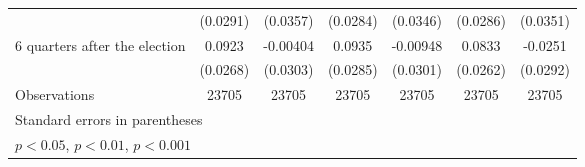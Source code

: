 \begin{table}[htbp]
\begin{tabular}{l*{6}{c}}
                    &    (0.0291)         &    (0.0357)         &    (0.0284)         &    (0.0346)         &    (0.0286)         &    (0.0351)         \\
[1em]
 6 quarters after the election&      0.0923\sym{***}&    -0.00404         &      0.0935\sym{**} &    -0.00948         &      0.0833\sym{**} &     -0.0251         \\
                    &    (0.0268)         &    (0.0303)         &    (0.0285)         &    (0.0301)         &    (0.0262)         &    (0.0292)         \\
\hline
Observations        &       23705         &       23705         &       23705         &       23705         &       23705         &       23705         \\
\hline\hline
\multicolumn{7}{l}{\footnotesize Standard errors in parentheses}\\
\multicolumn{7}{l}{\footnotesize \sym{*} \(p<0.05\), \sym{**} \(p<0.01\), \sym{***} \(p<0.001\)}\\
\end{tabular}
\end{table}

